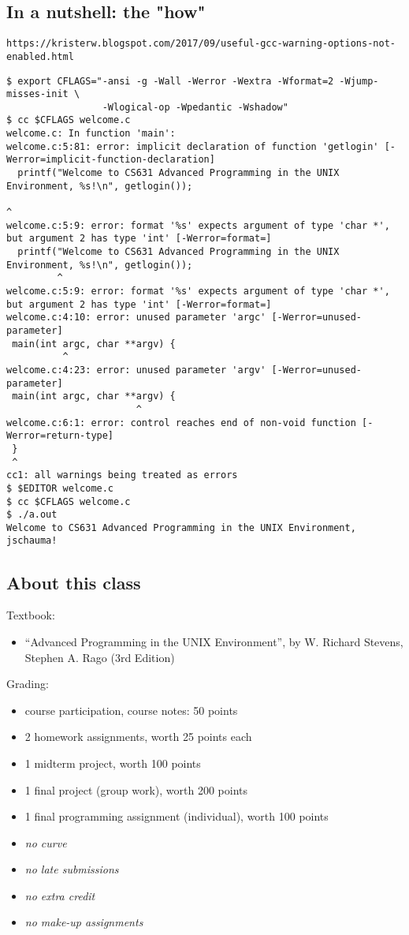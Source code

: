 \documentclass[sxga]{xdvislides}
\begin{document}
\subsection{In a nutshell: the "how"}
{\tt https://kristerw.blogspot.com/2017/09/useful-gcc-warning-options-not-enabled.html}

\small
\begin{verbatim}
$ export CFLAGS="-ansi -g -Wall -Werror -Wextra -Wformat=2 -Wjump-misses-init \
                 -Wlogical-op -Wpedantic -Wshadow"
$ cc $CFLAGS welcome.c
welcome.c: In function 'main':
welcome.c:5:81: error: implicit declaration of function 'getlogin' [-Werror=implicit-function-declaration]
  printf("Welcome to CS631 Advanced Programming in the UNIX Environment, %s!\n", getlogin());
                                                                                 ^
welcome.c:5:9: error: format '%s' expects argument of type 'char *', but argument 2 has type 'int' [-Werror=format=]
  printf("Welcome to CS631 Advanced Programming in the UNIX Environment, %s!\n", getlogin());
         ^
welcome.c:5:9: error: format '%s' expects argument of type 'char *', but argument 2 has type 'int' [-Werror=format=]
welcome.c:4:10: error: unused parameter 'argc' [-Werror=unused-parameter]
 main(int argc, char **argv) {
          ^
welcome.c:4:23: error: unused parameter 'argv' [-Werror=unused-parameter]
 main(int argc, char **argv) {
                       ^
welcome.c:6:1: error: control reaches end of non-void function [-Werror=return-type]
 }
 ^
cc1: all warnings being treated as errors
$ $EDITOR welcome.c
$ cc $CFLAGS welcome.c
$ ./a.out
Welcome to CS631 Advanced Programming in the UNIX Environment, jschauma!
\end{verbatim}
\Normalsize

\subsection{About this class}
Textbook:
\begin{itemize}
	\item ``Advanced Programming in the UNIX Environment'', by
		W. Richard Stevens, Stephen A. Rago (3rd Edition)
\end{itemize}
\addvspace{.25in}

Grading:
\begin{itemize}
	\item course participation, course notes: 50 points
	\item 2 homework assignments, worth 25 points each
	\item 1 midterm project, worth 100 points
	\item 1 final project (group work), worth 200 points
	\item 1 final programming assignment (individual), worth 100 points
	\item {\em no curve}
	\item {\em no late submissions}
	\item {\em no extra credit}
	\item {\em no make-up assignments}
\end{itemize}
\end{document}
